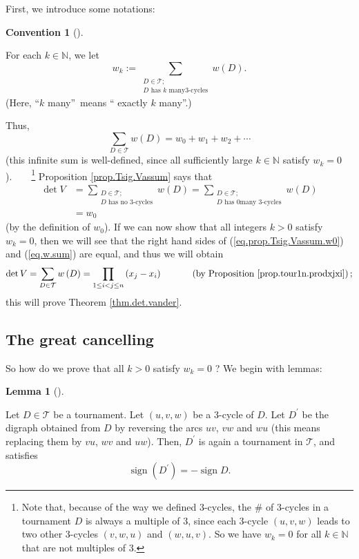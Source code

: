 \documentclass[numbers=enddot,12pt,final,onecolumn,notitlepage]{scrartcl}%
\numberwithin{exer}{subsection}
\theoremstyle{definition}
\newtheorem{lem}[theo]{Lemma}
\newenvironment{lemma}[1][]
{\begin{lem}[#1]\begin{leftbar}}
{\end{leftbar}\end{lem}}
\newtheorem{conv}[theo]{Convention}
\newenvironment{convention}[1][]
{\begin{conv}[#1]\begin{leftbar}}
{\end{leftbar}\end{conv}}
\let\sumnonlimits\sum
\let\prodnonlimits\prod
\renewcommand{\sum}{\sumnonlimits\limits}
\renewcommand{\prod}{\prodnonlimits\limits}
\begin{document}
First, we introduce some notations:

\begin{convention}
For each $k\in\mathbb{N}$, we let
\[
w_{k}:=\sum_{\substack{D\in\mathcal{T};\\D\text{ has }k\text{ many
}3\text{-cycles}}}w\left(  D\right)  .
\]
(Here, \textquotedblleft$k$ many\textquotedblright\ means \textquotedblleft
exactly $k$ many\textquotedblright.)
\end{convention}

Thus,
\begin{equation}
\sum_{D\in\mathcal{T}}w\left(  D\right)  =w_{0}+w_{1}+w_{2}+\cdots
\label{eq.w.sum}%
\end{equation}
(this infinite sum is well-defined, since all sufficiently large
$k\in\mathbb{N}$ satisfy $w_{k}=0$).\ \ \ \ \footnote{Note that, because of
the way we defined $3$-cycles, the $\#$ of $3$-cycles in a tournament $D$ is
always a multiple of $3$, since each $3$-cycle $\left(  u,v,w\right)  $ leads
to two other $3$-cycles $\left(  v,w,u\right)  $ and $\left(  w,u,v\right)  $.
So we have $w_{k}=0$ for all $k\in\mathbb{N}$ that are not multiples of $3$.}
Proposition \ref{prop.Tsig.Vassum} says that%
\begin{align}
\det V  &  =\sum_{\substack{D\in\mathcal{T};\\D\text{ has no }3\text{-cycles}%
}}w\left(  D\right)  =\sum_{\substack{D\in\mathcal{T};\\D\text{ has }0\text{
many }3\text{-cycles}}}w\left(  D\right) \nonumber\\
&  =w_{0} \label{eq.prop.Tsig.Vassum.w0}%
\end{align}
(by the definition of $w_{0}$). If we can now show that all integers $k>0$
satisfy $w_{k}=0$, then we will see that the right hand sides of
(\ref{eq.prop.Tsig.Vassum.w0}) and (\ref{eq.w.sum}) are equal, and thus we
will obtain%
\[
\det V=\sum_{D\in\mathcal{T}}w\left(  D\right)  =\prod_{1\leq i<j\leq
n}\left(  x_{j}-x_{i}\right)  \ \ \ \ \ \ \ \ \ \ \left(  \text{by Proposition
\ref{prop.tour1n.prodxjxi}}\right)  ;
\]
this will prove Theorem \ref{thm.det.vander}.

\subsection{The great cancelling}

So how do we prove that all $k>0$ satisfy $w_{k}=0$ ? We begin with lemmas:

\begin{lemma}
\label{lem.cancel.sign}Let $D\in\mathcal{T}$ be a tournament. Let $\left(
u,v,w\right)  $ be a $3$-cycle of $D$. Let $D^{\prime}$ be the digraph
obtained from $D$ by reversing the arcs $uv$, $vw$ and $wu$ (this means
replacing them by $vu$, $wv$ and $uw$). Then, $D^{\prime}$ is again a
tournament in $\mathcal{T}$, and satisfies%
\[
\operatorname*{sign}\left(  D^{\prime}\right)  =-\operatorname*{sign}D.
\]

\end{lemma}
\end{document}
